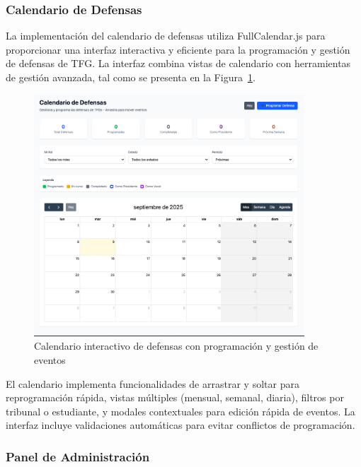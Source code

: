 \documentclass[12pt,a4paper,oneside]{report}
\begin{document}
\subsubsection{Calendario de Defensas}\label{calendario-de-defensas}

La implementación del calendario de defensas utiliza FullCalendar.js para proporcionar una interfaz interactiva y eficiente para la programación y gestión de defensas de TFG. La interfaz combina vistas de calendario con herramientas de gestión avanzada, tal como se presenta en la Figura~\ref{fig:calendario-defensas}.

\begin{figure}[H]
\centering
\includegraphics[width=0.9\textwidth]{processed/images/calendario_defensas.png}
\caption{Calendario interactivo de defensas con programación y gestión de eventos}
\label{fig:calendario-defensas}
\end{figure}

El calendario implementa funcionalidades de arrastrar y soltar para reprogramación rápida, vistas múltiples (mensual, semanal, diaria), filtros por tribunal o estudiante, y modales contextuales para edición rápida de eventos. La interfaz incluye validaciones automáticas para evitar conflictos de programación.

\subsubsection{Panel de Administración}\label{panel-de-administracion}
\end{document}
